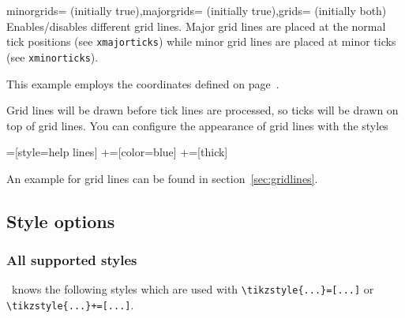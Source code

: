 	
\begin{pgfplotsxykeylist}{\x minorgrids= (initially true),\x majorgrids= (initially true),grids= (initially both)}
Enables/disables different grid lines. Major grid lines are placed at the normal tick positions (see \texttt{xmajorticks}) while minor grid lines are placed at minor ticks (see \texttt{xminorticks}). 

This example employs the coordinates defined on page~\pageref{page:plotcoords:src}.
\begin{codeexample}[]
\begin{tikzpicture}
\begin{loglogaxis}[
	xlabel={\textsc{Dof}},
	ylabel={$L_2$ Error},
	grid=major
]
\plotcoords
\end{loglogaxis}
\end{tikzpicture}
\end{codeexample}

\begin{codeexample}[]
\end{codeexample}

Grid lines will be drawn before tick lines are processed, so ticks will be drawn on top of grid lines. You can configure the appearance of grid lines with the styles
\begin{codeexample}
=[style=help lines] %
+=[color=blue]     %
+=[thick]          %
\end{codeexample}
An example for grid lines can be found in section~\ref{sec:gridlines}.
\end{pgfplotsxykeylist}






\subsection{Style options}
\subsubsection{All supported styles}
\PGFPlots\ knows the following styles which are used with \lstinline!\tikzstyle{...}=[...]! or \lstinline!\tikzstyle{...}+=[...]!.
\label{sec:styles}%


